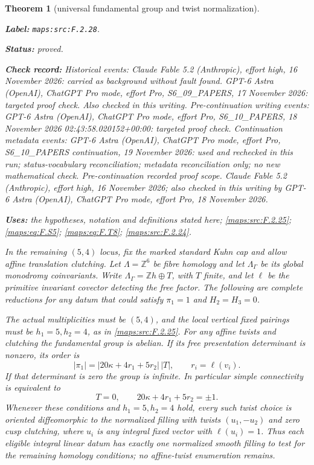\documentclass[11pt,a4paper]{article}
\newtheorem{theorem}{Theorem}[section]
\theoremstyle{definition}
\newcommand{\StatementRecord}[4]{\par\smallskip\begingroup\upshape\raggedright\noindent\textbf{Label:} \nolinkurl{#1}.\par\noindent\textbf{Status:} #2.\par\noindent\textbf{Check record:} #3.\par\noindent\textbf{Uses:} #4.\par\endgroup\smallskip}
\begin{document}
\begin{theorem}[universal fundamental group and twist normalization]\label{maps:src:F.2.28}
\StatementRecord{maps:src:F.2.28}{proved}{Historical events: Claude Fable 5.2 (Anthropic), effort high, 16 November 2026: carried as background without fault found. GPT-6 Astra (OpenAI), ChatGPT Pro mode, effort Pro, S6\_09\_PAPERS, 17 November 2026: targeted proof check. Also checked in this writing. Pre-continuation writing events: GPT-6 Astra (OpenAI), ChatGPT Pro mode, effort Pro, S6\_10\_PAPERS, 18 November 2026 02:43:58.020152+00:00: targeted proof check. Continuation metadata events: GPT-6 Astra (OpenAI), ChatGPT Pro mode, effort Pro, S6\_10\_PAPERS continuation, 19 November 2026: used and rechecked in this run; status-vocabulary reconciliation; metadata reconciliation only; no new mathematical check. \emph{Pre-continuation recorded proof scope.} Claude Fable 5.2 (Anthropic), effort high, 16 November 2026; also checked in this writing by GPT-6 Astra (OpenAI), ChatGPT Pro mode, effort Pro, 18 November 2026}{the hypotheses, notation and definitions stated here; \cref{maps:src:F.2.25}; \cref{maps:eq:F.S5}; \cref{maps:eq:F.T8}; \cref{maps:src:F.2.24}}


In the remaining $(5,4)$ locus, fix the marked standard Kuhn
cap and allow affine translation clutching.
Let $\Lambda=\mathbb Z^6$ be fibre homology and let
$\Lambda_\Gamma$ be its global monodromy coinvariants.
Write $\Lambda_\Gamma=\mathbb Zh\oplus T$, with $T$ finite,
and let $\ell$ be the primitive invariant covector detecting
the free factor.  The following are complete reductions for
any datum that could satisfy $\pi_1=1$ and $H_2=H_3=0$.

The actual multiplicities must be $(5,4)$, and the local
vertical fixed pairings must be $h_1=5,h_2=4$, as in \ref{maps:src:F.2.25}.
For any affine twists and clutching the fundamental group
is abelian.  If its free presentation determinant is nonzero,
its order is
\[
 |\pi_1|=|20\kappa+4r_1+5r_2|\,|T|,
 \qquad r_i=\ell(v_i).
 \tag{F.T11}\label{maps:eq:F.T11}
\]
If that determinant is zero the group is infinite.
In particular simple connectivity is equivalent to
\[
 T=0,\qquad 20\kappa+4r_1+5r_2=\pm1.
 \tag{F.T12}\label{maps:eq:F.T12}
\]
Whenever these conditions and $h_1=5,h_2=4$ hold, every
such twist choice is oriented diffeomorphic to the normalized
filling with twists $(u_1,-u_2)$ and zero cusp clutching,
where $u_i$ is any integral fixed vector with $\ell(u_i)=1$.
Thus each eligible integral linear datum has exactly one
normalized smooth filling to test for the remaining
homology conditions; no affine-twist enumeration remains.

\end{theorem}
\end{document}

